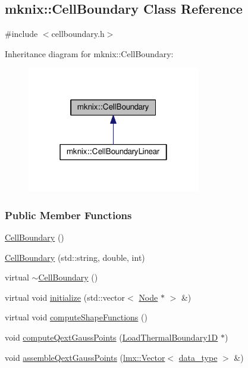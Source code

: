 \hypertarget{classmknix_1_1_cell_boundary}{}\subsection{mknix\+:\+:Cell\+Boundary Class Reference}
\label{classmknix_1_1_cell_boundary}


{\ttfamily \#include $<$cellboundary.\+h$>$}



Inheritance diagram for mknix\+:\+:Cell\+Boundary\+:\nopagebreak
\begin{figure}[H]
\begin{center}
\leavevmode
\includegraphics[width=214pt]{d4/d50/classmknix_1_1_cell_boundary__inherit__graph}
\end{center}
\end{figure}
\subsubsection*{Public Member Functions}
\begin{DoxyCompactItemize}
\item 
\hyperlink{classmknix_1_1_cell_boundary_a92ce1eba9565ff23c47bd091d8525685}{Cell\+Boundary} ()
\item 
\hyperlink{classmknix_1_1_cell_boundary_a6f60017dacb83bd9667e666c4d814adc}{Cell\+Boundary} (std\+::string, double, int)
\item 
virtual \hyperlink{classmknix_1_1_cell_boundary_ac93e019f0285d1701586a621599849c2}{$\sim$\+Cell\+Boundary} ()
\item 
virtual void \hyperlink{classmknix_1_1_cell_boundary_afeb33c21dbf85f27d372a06d1a249459}{initialize} (std\+::vector$<$ \hyperlink{classmknix_1_1_node}{Node} $\ast$ $>$ \&)
\item 
virtual void \hyperlink{classmknix_1_1_cell_boundary_a3821f8f675ec0545a25e9971a4f8aaf3}{compute\+Shape\+Functions} ()
\item 
void \hyperlink{classmknix_1_1_cell_boundary_a267c6e554c2607c8c703ff52fe1b381a}{compute\+Qext\+Gauss\+Points} (\hyperlink{classmknix_1_1_load_thermal_boundary1_d}{Load\+Thermal\+Boundary1\+D} $\ast$)
\item 
void \hyperlink{classmknix_1_1_cell_boundary_a962cb7795b25874914f27f5e7de49eb2}{assemble\+Qext\+Gauss\+Points} (\hyperlink{classlmx_1_1_vector}{lmx\+::\+Vector}$<$ \hyperlink{namespacemknix_a16be4b246fbf2cceb141e3a179111020}{data\+\_\+type} $>$ \&)
\end{DoxyCompactItemize}
